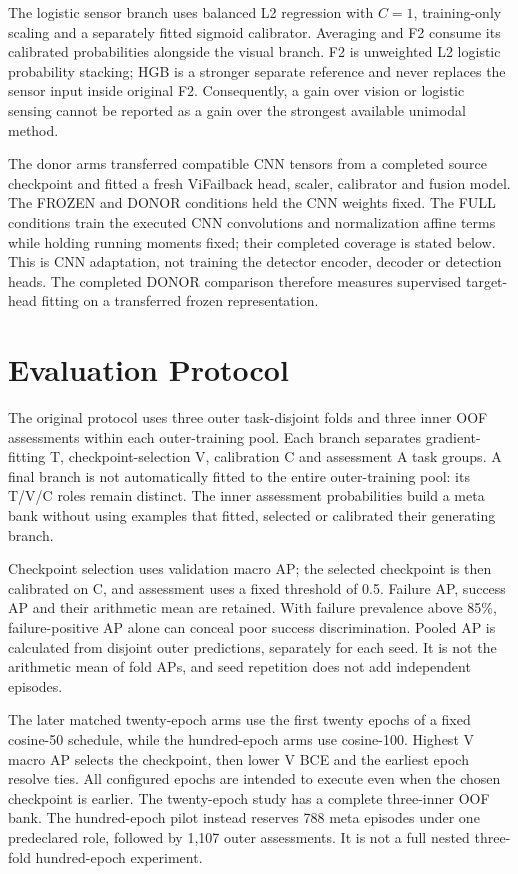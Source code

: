 The logistic sensor branch uses balanced L2 regression with $C=1$, training-only scaling
and a separately fitted sigmoid calibrator. Averaging and F2 consume its calibrated
probabilities alongside the visual branch. F2 is unweighted L2 logistic probability
stacking; HGB is a stronger separate reference and never replaces the sensor input
inside original F2. Consequently, a gain over vision or logistic sensing cannot be
reported as a gain over the strongest available unimodal method.

The donor arms transferred compatible CNN tensors from a completed source checkpoint and
fitted a fresh ViFailback head, scaler, calibrator and fusion model. The FROZEN and
DONOR conditions held the CNN weights fixed. The FULL conditions train the executed CNN
convolutions and normalization affine terms while holding running moments fixed; their
completed coverage is stated below. This is CNN adaptation, not training the detector
encoder, decoder or detection heads. The completed DONOR comparison therefore measures
supervised target-head fitting on a transferred frozen representation.

\section{Evaluation Protocol}
The original protocol uses three outer task-disjoint folds and three inner OOF
assessments within each outer-training pool. Each branch separates gradient-fitting T,
checkpoint-selection V, calibration C and assessment A task groups. A final branch is
not automatically fitted to the entire outer-training pool: its T/V/C roles remain
distinct. The inner assessment probabilities build a meta bank without using examples
that fitted, selected or calibrated their generating branch.

Checkpoint selection uses validation macro AP; the selected checkpoint is then
calibrated on C, and assessment uses a fixed threshold of 0.5. Failure AP, success AP
and their arithmetic mean are retained. With failure prevalence above 85\%,
failure-positive AP alone can conceal poor success discrimination. Pooled AP is
calculated from disjoint outer predictions, separately for each seed. It is not the
arithmetic mean of fold APs, and seed repetition does not add independent episodes.

The later matched twenty-epoch arms use the first twenty epochs of a fixed cosine-50
schedule, while the hundred-epoch arms use cosine-100. Highest V macro AP selects the
checkpoint, then lower V BCE and the earliest epoch resolve ties. All configured epochs
are intended to execute even when the chosen checkpoint is earlier. The twenty-epoch
study has a complete three-inner OOF bank. The hundred-epoch pilot instead reserves 788
meta episodes under one predeclared role, followed by 1,107 outer assessments. It is not
a full nested three-fold hundred-epoch experiment.

